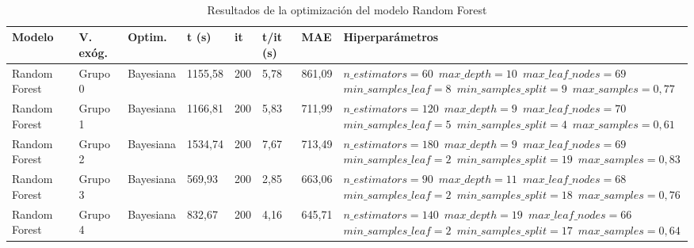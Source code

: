 \documentclass[12pt,a4paper]{report}
\begin{document}
\begin{table}[H]
\centering
\caption{\\ Resultados de la optimización del modelo Random Forest}
\scriptsize
\begin{tabular}{m{1cm} m{1.2cm} m{1.2cm} m{1cm} m{1cm} m{1.2cm} m{1.2cm} m{3.5cm}} 
\toprule
\textbf{Modelo} & \textbf{V. exóg.} & \textbf{Optim.} & \textbf{t (s)} & \textbf{it} & \textbf{t/it (s)} & \textbf{MAE} & \textbf{Hiperparámetros} \\
\midrule
Random Forest   & Grupo 0 & Bayesiana & 1155,58 & 200 & 5,78 & 861,09 & \texttt{$n\_estimators=60$ \newline $max\_depth=10$ \newline $max\_leaf\_nodes=69$ \newline $min\_samples\_leaf=8$ \newline $min\_samples\_split=9$ \newline $max\_samples=0,77$} \\[0.5em]
\hline
Random Forest   & Grupo 1 & Bayesiana & 1166,81 & 200 & 5,83 & 711,99 & \texttt{$n\_estimators=120$ \newline $max\_depth=9$ \newline $max\_leaf\_nodes=70$ \newline $min\_samples\_leaf=5$ \newline $min\_samples\_split=4$ \newline $max\_samples=0,61$} \\[0.5em]
\hline
Random Forest   & Grupo 2 & Bayesiana & 1534,74 & 200 & 7,67 & 713,49 & \texttt{$n\_estimators=180$ \newline $max\_depth=9$ \newline $max\_leaf\_nodes=69$ \newline $min\_samples\_leaf=2$ \newline $min\_samples\_split=19$ \newline $max\_samples=0,83$} \\[0.5em]
\hline
Random Forest   & Grupo 3 & Bayesiana & 569,93  & 200 & 2,85 & 663,06 & \texttt{$n\_estimators=90$ \newline $max\_depth=11$ \newline $max\_leaf\_nodes=68$ \newline $min\_samples\_leaf=2$ \newline $min\_samples\_split=18$ \newline $max\_samples=0,76$} \\[0.5em]
\hline
Random Forest   & Grupo 4 & Bayesiana & 832,67  & 200 & 4,16 & 645,71 & \texttt{$n\_estimators=140$ \newline $max\_depth=19$ \newline $max\_leaf\_nodes=66$ \newline $min\_samples\_leaf=2$ \newline $min\_samples\_split=17$ \newline $max\_samples=0,64$} \\[0.5em]

\end{tabular}
\end{table}
\end{document}

